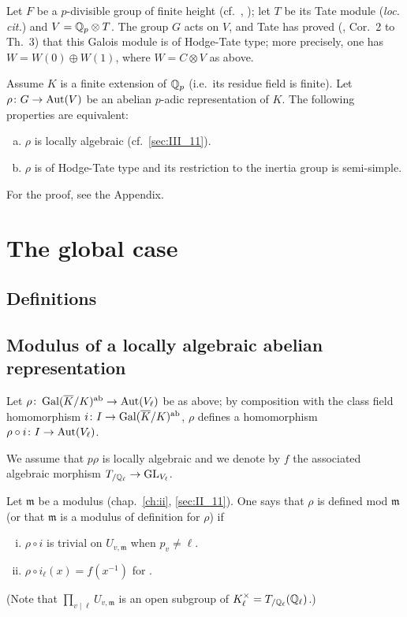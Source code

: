 \begin{ex}
	Let $F$ be a $p$-divisible group of finite height (cf.\ \cite{26},
	\cite{39}); let $T$ be its Tate module (\emph{loc. cit.}) and $V = \mathbb{Q}_p
	\otimes T$. The group $G$ acts on $V$, and Tate has proved (\cite{39},
	Cor.~2 to Th.~3) that this Galois module is of Hodge-Tate type; more
	precisely, one has $W = W(0) \oplus W(1)$, where $W = C \otimes V$ as
	above.
\end{ex}
\begin{thm}[Tate]
Assume $K$ is a finite extension of $\mathbb{Q}_p$ (i.e.\ its residue field is finite).
Let $\rho\colon G \to \operatorname{Aut}(V)$ be an abelian $p$-adic representation of $K$.
The following properties are equivalent:
\begin{enumerate}[(a)]
\item $\rho$ is locally algebraic (cf.\ \ref{sec:III_11}).
\item $\rho$ is of Hodge-Tate type and its restriction to the inertia group is
	semi-simple.
\end{enumerate}
\end{thm}
For the proof, see the Appendix.

\section{The global case}
\subsection{Definitions}
\label{sec:III_21}

\subsection{Modulus of a locally algebraic abelian representation}
\label{sec:III_22}
Let $\rho\colon \operatorname{Gal}(\overline{K}/K)^{\mathrm{ab}} \to \operatorname{Aut}(V_\ell)$ be as above; by
composition with the class field homomorphism $i\colon I \to \operatorname{Gal}(\overline{K}/K)^{\mathrm{ab}}$, $\rho$ defines a homomorphism $\rho \circ i\colon I \to \operatorname{Aut}(V_\ell)$.

We assume that $p\rho$ is locally algebraic and we denote by $f$ the associated
\dpage
algebraic morphism $T_{/\mathbb{Q}_\ell} \to \operatorname{GL}_{V_\ell}$.
\begin{mydef}
Let $\mathfrak{m}$ be a modulus (chap.~\ref{ch:ii}, \ref{sec:II_11}).
One says that $\rho$ is defined mod $\mathfrak{m}$ (or that
$\mathfrak{m}$ is a modulus of definition for $\rho$) if
\begin{enumerate}[(i)]
	\item $\rho \circ i$ is trivial on $U_{v, \mathfrak{m}}$ when $p_v \ne
		\ell$.
	\item $\rho \circ i_\ell(x) = f(x^{-1})$ for .
\end{enumerate}
\end{mydef}
(Note that $\prod_{v\mid\ell} U_{v, \mathfrak{m}}$ is an open subgroup of
$K_\ell^\times = T_{/\mathbb{Q}_\ell}(\mathbb{Q}_\ell)$.)

